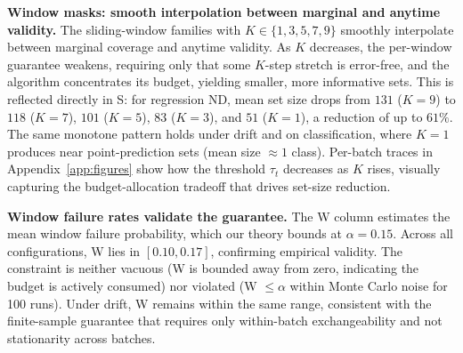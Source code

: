 \documentclass{uai2026} %
\newcommand{\1}{\mathbf{1}}
\begin{document}
\textbf{Window masks: smooth interpolation between marginal and anytime validity.}
The sliding-window families with $K \in \{1, 3, 5, 7, 9\}$ smoothly interpolate between marginal coverage and anytime validity.
As $K$ decreases, the per-window guarantee weakens, requiring only that some $K$-step stretch is error-free, and the algorithm concentrates its budget, yielding smaller, more informative sets.
This is reflected directly in S: for regression ND, mean set size drops from $131$ ($K{=}9$) to $118$ ($K{=}7$), $101$ ($K{=}5$), $83$ ($K{=}3$), and $51$ ($K{=}1$), a reduction of up to $61\%$.
The same monotone pattern holds under drift and on classification, where $K{=}1$ produces near point-prediction sets (mean size ${\approx}1$ class).
Per-batch traces in Appendix~\ref{app:figures} show how the threshold $\tau_t$ decreases as $K$ rises, visually capturing the budget-allocation tradeoff that drives set-size reduction.

\textbf{Window failure rates validate the guarantee.}
The W column estimates the mean window failure probability, which our theory bounds at $\alpha{=}0.15$.
Across all configurations, W lies in $[0.10, 0.17]$, confirming empirical validity.
The constraint is neither vacuous (W is bounded away from zero, indicating the budget is actively consumed) nor violated (W $\le \alpha$ within Monte Carlo noise for 100 runs).
Under drift, W remains within the same range, consistent with the finite-sample guarantee that requires only within-batch exchangeability and not stationarity across batches.


\end{document}
